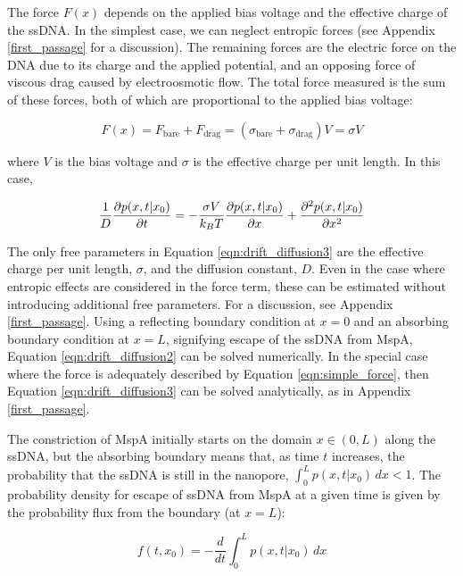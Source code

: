 The force $F(x)$ depends on the applied bias voltage and the effective charge of the ssDNA.  In the simplest case, we can neglect entropic forces (see Appendix \ref{first_passage} for a discussion).  The remaining forces are the electric force on the DNA due to its charge and the applied potential, and an opposing force of viscous drag caused by electroosmotic flow.  The total force measured is the sum of these forces, both of which are proportional to the applied bias voltage:

\begin{equation}
F(x) = F_{\text{bare}} + F_{\text{drag}} = (\sigma_{\text{bare}} + \sigma_{\text{drag}}) V = \sigma V
\label{eqn:simple_force}
\end{equation}

\noindent
where $V$ is the bias voltage and $\sigma$ is the effective charge per unit length.  In this case,

\begin{equation}
\frac{1}{D} \frac{\partial p(x,t|x_0)}{\partial t} = - \frac{\sigma V}{k_B T} \frac{\partial p(x,t|x_0)}{\partial x} + \frac{\partial^2 p(x,t|x_0)}{\partial x^2}
\label{eqn:drift_diffusion3}
\end{equation}

The only free parameters in Equation \ref{eqn:drift_diffusion3} are the effective charge per unit length, $\sigma$, and the diffusion constant, $D$.  Even in the case where entropic effects are considered in the force term, these can be estimated without introducing additional free parameters.  For a discussion, see Appendix \ref{first_passage}.  Using a reflecting boundary condition at $x=0$ and an absorbing boundary condition at $x=L$, signifying escape of the ssDNA from MspA, Equation \ref{eqn:drift_diffusion2} can be solved numerically.  In the special case where the force is adequately described by Equation \ref{eqn:simple_force}, then Equation \ref{eqn:drift_diffusion3} can be solved analytically, as in Appendix \ref{first_passage}.

The constriction of MspA initially starts on the domain $x \in (0,L)$ along the ssDNA, but the absorbing boundary means that, as time $t$ increases, the probability that the ssDNA is still in the nanopore, $\int_0^L p(x,t|x_0) \, dx < 1$.  The probability density for escape of ssDNA from MspA at a given time is given by the probability flux from the boundary (at $x=L$):

\begin{equation}
f(t,x_0) = -\frac{d}{dt} \int_0^L p(x,t|x_0) \, dx
\label{eqn:escape_time_dist}
\end{equation}

